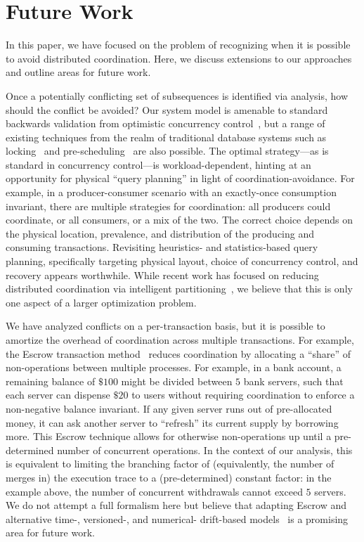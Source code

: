 
\section{Future Work}
\label{sec:discussion}

In this paper, we have focused on the problem of recognizing when it
is possible to avoid distributed coordination. Here, we discuss
extensions to our approaches and outline areas for future work.

 Once a potentially conflicting set of
subsequences is identified via \iconfluence analysis, how should the
conflict be avoided? Our system model is amenable to standard
backwards validation from optimistic concurrency
control~\cite{bernstein-book}, but a range of existing techniques from
the realm of traditional database systems such as
locking~\cite{gray-virtues} and pre-scheduling~\cite{calvin} are also
possible. The optimal strategy---as is standard in concurrency
control---is workload-dependent, hinting at an opportunity for
physical ``query planning'' in light of coordination-avoidance. For
example, in a producer-consumer scenario with an exactly-once
consumption invariant, there are multiple strategies for coordination:
all producers could coordinate, or all consumers, or a mix of the
two. The correct choice depends on the physical location, prevalence,
and distribution of the producing and consuming
transactions. Revisiting heuristics- and statistics-based query
planning, specifically targeting physical layout, choice of
concurrency control, and recovery appears worthwhile. While recent
work has focused on reducing distributed coordination via intelligent
partitioning~\cite{schism}, we believe that this is only one aspect of
a larger optimization problem.

 We have analyzed conflicts on a
per-transaction basis, but it is possible to amortize the overhead of
coordination across multiple transactions. For example, the Escrow
transaction method~\cite{escrow} reduces coordination by allocating a
``share'' of non-\iconfluent operations between multiple
processes. For example, in a bank account, a remaining balance of
$\$100$ might be divided between $5$ bank servers, such that each
server can dispense $\$20$ to users without requiring coordination to
enforce a non-negative balance invariant. If any given server runs out
of pre-allocated money, it can ask another server to ``refresh'' its
current supply by borrowing more. This Escrow technique allows
\cfreedom for otherwise non-\iconfluent operations up until a
pre-determined number of concurrent operations. In the context of our
\cfreedom analysis, this is equivalent to limiting the branching
factor of (equivalently, the number of merges in) the execution trace
to a (pre-determined) constant factor: in the example above, the
number of concurrent withdrawals cannot exceed $5$ servers. We do not
attempt a full formalism here but believe that adapting Escrow and
alternative time-, versioned-, and numerical- drift-based
models~\cite{yu-conit} is a promising area for future work.

